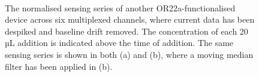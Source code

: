 \documentclass[
  a4paper,
]{scrbook}
\begin{document}
\begin{figure}
\begin{minipage}[t]{0.70\linewidth}
{{}

}

\end{minipage}%
%
\begin{minipage}[t]{0.15\linewidth}

{\centering 

~

}

\end{minipage}%

\caption{\label{fig-OR22a-variability}The normalised sensing series of
another OR22a-functionalised device across six multiplexed channels,
where current data has been despiked and baseline drift removed. The
concentration of each 20 µL addition is indicated above the time of
addition. The same sensing series is shown in both (a) and (b), where a
moving median filter has been applied in (b).}

\end{figure}
\end{document}

